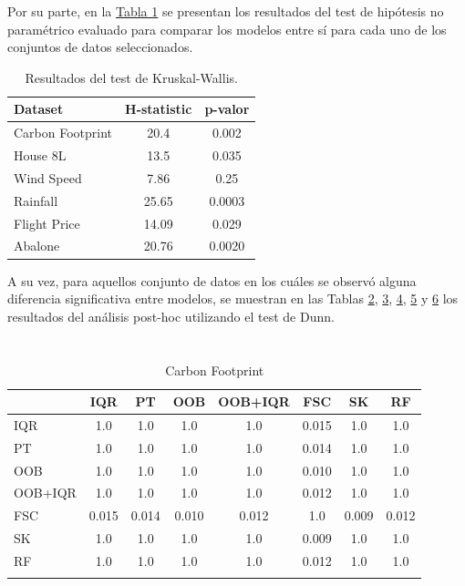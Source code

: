 \FloatBarrier

Por su parte, en la \hyperref[tab1]{Tabla 1} se presentan los resultados del test de hipótesis no paramétrico evaluado para comparar los modelos entre sí para cada uno de los conjuntos de datos seleccionados.

\begin{table}[h!]
\centering
\begin{tabular}{lcc}
\toprule
\textbf{Dataset} & \textbf{H-statistic} & \textbf{p-valor} \\
\midrule
Carbon Footprint & 20.4  & 0.002 \\
House 8L         & 13.5  & 0.035 \\
Wind Speed       & 7.86  & 0.25 \\
Rainfall         & 25.65 & 0.0003 \\
Flight Price     & 14.09 & 0.029 \\
Abalone          & 20.76 & 0.0020 \\
\bottomrule
\end{tabular}
\caption{Resultados del test de Kruskal-Wallis.}
\label{tab1}
\end{table}

\FloatBarrier

A su vez, para aquellos conjunto de datos en los cuáles se observó alguna diferencia significativa entre modelos, se muestran en las Tablas \hyperref[tab2]{2}, \hyperref[tab3]{3}, \hyperref[tab4]{4}, \hyperref[tab5]{5} y \hyperref[tab6]{6} los resultados del análisis post-hoc utilizando el test de Dunn.

\section*{}

\begin{longtable}{lccccccc}
\toprule
   & IQR     & PT     & OOB     & OOB+IQR     & FSC      & SK     & RF     \\
\midrule
IQR  & 1.0   & 1.0   & 1.0   & 1.0   & 0.015  & 1.0   & 1.0   \\
PT  & 1.0   & 1.0   & 1.0   & 1.0   & 0.014  & 1.0   & 1.0   \\
OOB  & 1.0   & 1.0   & 1.0   & 1.0   & 0.010  & 1.0   & 1.0   \\
OOB+IQR  & 1.0   & 1.0   & 1.0   & 1.0   & 0.012  & 1.0   & 1.0   \\
FSC  & 0.015 & 0.014 & 0.010 & 0.012 & 1.0    & 0.009 & 0.012 \\
SK  & 1.0   & 1.0   & 1.0   & 1.0   & 0.009  & 1.0   & 1.0   \\
RF  & 1.0   & 1.0   & 1.0   & 1.0   & 0.012  & 1.0   & 1.0   \\
\bottomrule
\caption{Carbon Footprint}
\end{longtable}
\label{tab2}

